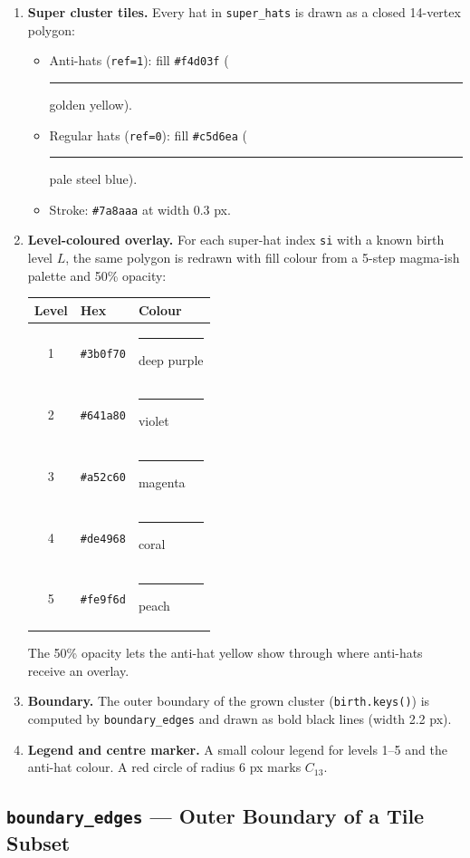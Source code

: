\documentclass[10pt,a4paper]{article}
\let\polysubsection\subsection
\renewcommand\subsection{\needspace{0.12\textheight}\polysubsection}
\newcommand{\code}[1]{\texttt{\small #1}}
\begin{document}
\begin{enumerate}
  \item \textbf{Super cluster tiles.}  Every hat in \code{super\_hats} is drawn
    as a closed 14-vertex polygon:
    \begin{itemize}
      \item Anti-hats (\code{ref=1}): fill \texttt{\#f4d03f}
        ({\color{antiyellow}\rule{0.8em}{0.8em}} golden yellow).
      \item Regular hats (\code{ref=0}): fill \texttt{\#c5d6ea}
        ({\color{hatblue}\rule{0.8em}{0.8em}} pale steel blue).
      \item Stroke: \texttt{\#7a8aaa} at width 0.3 px.
    \end{itemize}
  \item \textbf{Level-coloured overlay.}  For each super-hat index \code{si}
    with a known birth level $L$, the same polygon is redrawn with fill colour
    from a 5-step magma-ish palette and 50\% opacity:
    \begin{center}
    \begin{tabular}{@{}cll@{}}
    \toprule
    \textbf{Level} & \textbf{Hex} & \textbf{Colour} \\
    \midrule
    1 & \texttt{\#3b0f70} & {\color{lvone}\rule{1em}{0.8em}} deep purple \\
    2 & \texttt{\#641a80} & {\color{lvtwo}\rule{1em}{0.8em}} violet \\
    3 & \texttt{\#a52c60} & {\color{lvthree}\rule{1em}{0.8em}} magenta \\
    4 & \texttt{\#de4968} & {\color{lvfour}\rule{1em}{0.8em}} coral \\
    5 & \texttt{\#fe9f6d} & {\color{lvfive}\rule{1em}{0.8em}} peach \\
    \bottomrule
    \end{tabular}
    \end{center}
    The 50\% opacity lets the anti-hat yellow show through where anti-hats
    receive an overlay.
  \item \textbf{Boundary.}  The outer boundary of the grown cluster
    (\code{birth.keys()}) is computed by \code{boundary\_edges} and drawn
    as bold black lines (width 2.2 px).
  \item \textbf{Legend and centre marker.}  A small colour legend for levels
    1–5 and the anti-hat colour.  A red circle of radius 6 px marks $C_{13}$.
\end{enumerate}

\subsection{\code{boundary\_edges} — Outer Boundary of a Tile Subset}
\end{document}

